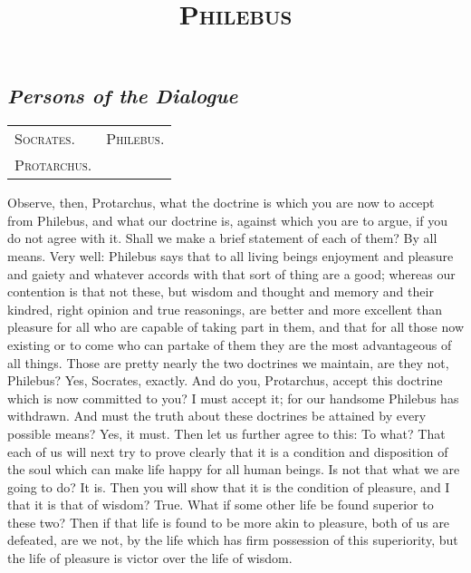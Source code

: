 \documentclass[letterpaper,12pt]{article}
\title{\vspace{-2.5cm} \scshape Philebus \vspace{-8mm}}
\author{}
\date{
	\vspace{-1em}
		\small \fontfamily{ppl}\selectfont Written by Plato, translated by Harold North Fowler, 1925
	\begin{center}
		$\mathsection$
	\end{center}
		\vspace{-2em}
	}
\newcommand{\stephpag}[1]{\marginnote{\small\itshape\fontfamily{ppl}\selectfont #1}}
\newenvironment{setting}
	{
		\setlength{\tabcolsep}{4em}
		\begin{center}
			\section*{\normalsize \fontfamily{ppl}\selectfont \itshape \bfseries Persons of the Dialogue\vspace{-1mm}}
			\par
			\begin{tabular}{ll}
	}
	{
			\end{tabular}
		\end{center}
		
		\hrulefill		
	}
\begin{document}

\begin{minipage}{15.45cm}
\maketitle

\begin{setting}
	\textsc{Socrates.}	& \textsc{Philebus.} \\
	\textsc{Protarchus.}	& 
\end{setting}
\end{minipage}
\setlength{\parindent}{2em}

\begin{drama}
\socratesspeaks
\stephpag{11 a}Observe, then, Protarchus, what the doctrine is which you are now to accept from Philebus, and what our doctrine is, against which you are to argue, if you do not agree with it. \stephpag{b} Shall we make a brief statement of each of them?
\protarchusspeaks
By all means.
\socratesspeaks
Very well: Philebus says that to all living beings enjoyment and pleasure and gaiety and whatever accords with that sort of thing are a good; whereas our contention is that not these, but wisdom and thought and memory and their kindred, right opinion and true reasonings, \stephpag{c} are better and more excellent than pleasure for all who are capable of taking part in them, and that for all those now existing or to come who can partake of them they are the most advantageous of all things. Those are pretty nearly the two doctrines we maintain, are they not, Philebus?
\philebusspeaks
Yes, Socrates, exactly.
\socratesspeaks
And do you, Protarchus, accept this doctrine which is now committed to you?
\protarchusspeaks
I must accept it; for our handsome Philebus has withdrawn.
\socratesspeaks
And must the truth about these doctrines be attained by every possible means? \stephpag{d}
\protarchusspeaks
Yes, it must.
\socratesspeaks
Then let us further agree to this:
\protarchusspeaks
To what?
\socratesspeaks
That each of us will next try to prove clearly that it is a condition and disposition of the soul which can make life happy for all human beings. Is not that what we are going to do?
\protarchusspeaks
It is.
\socratesspeaks
Then you will show that it is the condition of pleasure, and I that it is that of wisdom?
\protarchusspeaks
True.
\socratesspeaks
What if some other life be found superior to these two? \stephpag{e} Then if that life is found to be more akin to pleasure, both of us are defeated, are we not, by the life which has firm possession of this superiority, \stephpag{12 a} but the life of pleasure is victor over the life of wisdom.

\end{drama}
\end{document}
